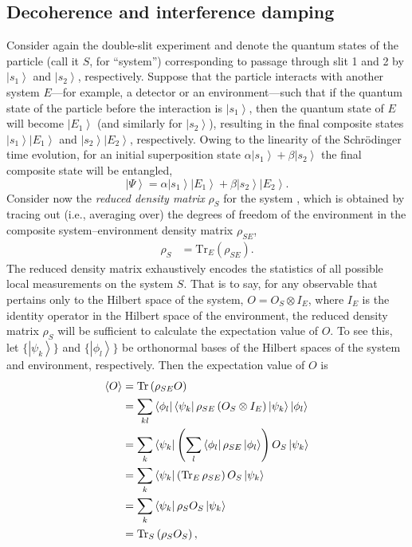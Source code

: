 \documentclass[3p,sort&compress,12pt]{elsarticle}
\newcommand{\bra}[1]{\left\langle{#1}\right\vert}
\newcommand{\ket}[1]{\left\vert{#1}\right\rangle}
\newcommand{\op}[1]{#1}
\begin{document}
\subsection{Decoherence and interference damping}

Consider again the double-slit experiment and denote the quantum states of the particle (call it $S$, for ``system'') corresponding to passage through slit 1 and 2 by $\ket{s_1}$ and $\ket{s_2}$, respectively. Suppose that the particle interacts with another system $E$---for example, a detector or an environment---such that if the quantum state of the particle before the interaction is $\ket{s_1}$, then the quantum state of $E$ will become $\ket{E_1}$ (and similarly for $\ket{s_2}$), resulting in the final composite states $\ket{s_1}\ket{E_1}$ and $\ket{s_2}\ket{E_2}$, respectively. Owing to the linearity of the Schr\"odinger time evolution, for an initial superposition state $\alpha\ket{s_1}+\beta\ket{s_2}$ the final composite state will be entangled,
%
\begin{equation}
\label{eq:1dlkf}
\ket{\Psi} = \alpha \ket{s_1} \ket{E_1} + \beta \ket{s_2} \ket{E_2}.
\end{equation}
%
Consider now the \emph{reduced density matrix} $\op{\rho}_S$ for the system \cite{Landau:1927:uy,Neumann:1932:gq,Furry:1936:pp}, which is obtained by tracing out (i.e., averaging over) the degrees of freedom of the environment in the composite system--environment density matrix $\op{\rho}_{SE}$,
%
\begin{align}
  \label{eq:aa12rm}
 \op{\rho}_S &= \text{Tr}_E(\op{\rho}_{SE}).
\end{align}
%
The reduced density matrix exhaustively encodes the statistics of all possible local measurements on the system $S$. That is to say, for any observable that pertains only to the Hilbert space of the system, $\op{O} = \op{O}_S\otimes \op{I}_E$, where $\op{I}_E$ is the identity operator in the Hilbert space of the environment, the reduced density matrix $\op{\rho}_S$ will be sufficient to calculate the expectation value of $\op{O}$. To see this, let $\{ \ket{\psi_k} \}$ and $\{ \ket{\phi_l} \}$ be orthonormal bases of the Hilbert spaces of the system and environment, respectively. Then the expectation value of $\op{O}$ is
%
\begin{align}
\label{eq:rcae}
\langle \op{O} \rangle &= \text{Tr} \, (\op{\rho}_{SE}\op{O})  \notag \\
&= \sum_{kl} \bra{\phi_l} \bra{\psi_k} \op{\rho}_{SE}
\left(\op{O}_S \otimes
\op{I}_E\right) \ket{\psi_k}  \ket{\phi_l} \notag \\
&= \sum_{k} \bra{\psi_k} \left( \sum_l \bra{\phi_l}
  \op{\rho}_{SE}
  \ket{\phi_l}  \right) \op{O}_S \ket{\psi_k} \notag \\
&= \sum_{k} \bra{\psi_k} \left( \text{Tr}_E \, \op{\rho}_{SE}
\right) \op{O}_S \ket{\psi_k} \notag \\
&= \sum_{k} \bra{\psi_k} \op{\rho}_S\op{O}_S
\ket{\psi_k} \notag \\
&= \text{Tr}_S \left( \op{\rho}_S
  \op{O}_S \right),
\end{align}
\end{document}
